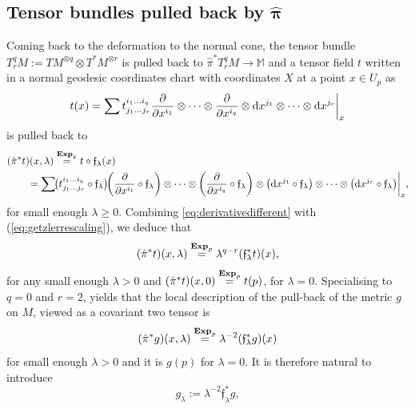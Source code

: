 \documentclass[pdftex]{sigma}
\numberwithin{equation}{section}
\theoremstyle{definition}
\newcommand{\M}{\mathbb M}
\begin{document}
\subsection[Tensor bundles pulled back by hat pi]{Tensor bundles pulled back by $\boldsymbol{\hat\pi}$} %
 Coming back to the deformation to the normal cone, the tensor bundle $T_r^qM:=TM^{\otimes q}\otimes T^*M^{\otimes r}$ is pulled back to $\hat \pi^* T^q_rM \longrightarrow \M$ and a tensor field $t$ written in a normal geodesic coordinates chart with coordinates $X$ at a point $x\in U_p$ as
\begin{equation}\label{eq:tensor}
t(x)=\sum t_{j_1\dots j_r}^{i_1 \dots i_q}\frac{\partial}{\partial x^{i_1}} \otimes\dots\otimes \frac{\partial}{\partial x^{i_q}} \otimes {\rm d}x^{j_1}\otimes\dots\otimes {\rm d}x^{j_r}\bigg|_x
\end{equation}
is pulled back to
\begin{align*}%
&(\hat \pi^* t)(x,\lambda) \overset{\text{\bf Exp}_p}{=} t\circ \mathfrak{f}_\lambda(x)\nonumber\\
&\qquad{}=\sum\! \bigl(t_{j_1\dots j_r}^{i_1 \dots i_q}\circ \mathfrak{f}_\lambda\bigr)\! \biggl(\frac{\partial}{\partial x^{i_1}}\circ \mathfrak{f}_\lambda\biggr) \otimes\dots\otimes \biggl(\frac{\partial}{\partial x^{i_q}}\circ \mathfrak{f}_\lambda\biggr) \otimes \bigl({\rm d}x^{j_1}\circ \mathfrak{f}_\lambda\bigr) \otimes\dots\otimes \bigl({\rm d}x^{j_r}\circ \mathfrak{f}_\lambda\bigr)\biggl|_x,
\end{align*}
for small enough $\lambda\geq 0$. Combining \eqref{eq:derivativedifferent} with (\ref{eq:getzlerrescaling}), we deduce that
\begin{equation*}
(\hat \pi^* t)(x,\lambda)\overset{\text{\bf Exp}_p}{=}\lambda^{q-r}(\mathfrak{f}_\lambda^*t)(x),
\end{equation*}
for any small enough $\lambda>0$ and $(\hat \pi^* t)(x,0)\overset{\text{\bf Exp}_p}{=}t(p)$, for $\lambda=0$. Specialising to $q=0$ and $r=2$, yields that the local description of the pull-back of the metric $g$ on $M$, viewed as a covariant two tensor is
\begin{equation}\label{eq:pistarg}
(\hat \pi^* g)(x,\lambda)\overset{\text{\bf Exp}_p}{=}\lambda^{-2} ({\mathfrak f}_\lambda^*g)(x)
\end{equation}
for small enough $\lambda>0$ and it is $g(p)$ for $\lambda=0$. It is therefore natural to introduce \begin{equation}\label{eq:glambda}g_\lambda:=\lambda^{-2} \mathfrak{f}_\lambda^* g,
\end{equation}
\end{document}
